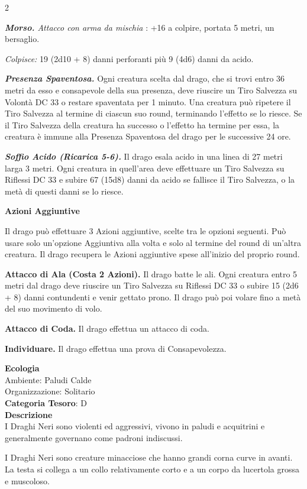 \begin{multicols}{2}
{\emph{\textbf{Morso.} Attacco con arma da mischia} : +16 a colpire, portata 5 metri, un bersaglio.

\emph{Colpisce:} 19 (2d10 + 8) danni perforanti più 9 (4d6) danni da acido.

\emph{\textbf{Presenza Spaventosa.}} Ogni creatura scelta dal drago, che si trovi entro 36 metri da esso e consapevole della sua presenza, deve riuscire un Tiro Salvezza su Volontà DC 33 o restare spaventata per 1 minuto. Una creatura può ripetere il Tiro Salvezza al termine di ciascun suo round, terminando l'effetto se lo riesce. Se il Tiro Salvezza della creatura ha successo o l'effetto ha termine per essa, la creatura è immune alla Presenza Spaventosa del drago per le successive 24 ore.

\emph{\textbf{Soffio Acido (Ricarica 5-6).}} Il drago esala acido in una linea di 27 metri larga 3 metri. Ogni creatura in quell'area deve effettuare un Tiro Salvezza su Riflessi DC 33 e subire 67 (15d8) danni da acido se fallisce il Tiro Salvezza, o la metà di questi danni se lo riesce.

\textbf{Azioni Aggiuntive}

Il drago può effettuare 3 Azioni aggiuntive, scelte tra le opzioni seguenti. Può usare solo un'opzione Aggiuntiva alla volta e solo al termine del round di un'altra creatura. Il drago recupera le Azioni aggiuntive spese all'inizio del proprio round.

\textbf{Attacco di Ala (Costa 2 Azioni).} Il drago batte le ali. Ogni creatura entro 5 metri dal drago deve riuscire un Tiro Salvezza su Riflessi DC 33 o subire 15 (2d6 + 8) danni contundenti e venir gettato prono. Il drago può poi volare fino a metà del suo movimento di volo.

\textbf{Attacco di Coda.} Il drago effettua un attacco di coda.

\textbf{Individuare.} Il drago effettua una prova di Consapevolezza.

\textbf{Ecologia}\\
Ambiente: Paludi Calde\\
Organizzazione: Solitario\\
\textbf{Categoria Tesoro}: D\\
\textbf{Descrizione}\\
I Draghi Neri sono violenti ed aggressivi, vivono in paludi e acquitrini e generalmente governano come padroni indiscussi.

I Draghi Neri sono creature minacciose che hanno grandi corna curve in avanti.
La testa si collega a un collo relativamente corto e a un corpo da lucertola grossa e muscoloso.

}
\end{multicols}
